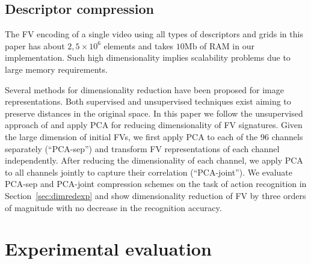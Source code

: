 \documentclass[10pt,twocolumn,letterpaper]{article}
\begin{document}
\subsection{Descriptor compression}
\label{sec:dimred}
The FV encoding of a single video using all types of descriptors and grids in this paper has about $2,5\times10^6$ elements and takes $10\text{Mb}$ of RAM in our implementation. Such high dimensionality implies scalability problems due to large memory requirements. %

Several methods for dimensionality reduction have been proposed for image representations. Both supervised and unsupervised techniques exist aiming to preserve distances in the original space.
In this paper we follow the unsupervised approach of \cite{Jegou12} and apply PCA for reducing dimensionality of FV signatures. Given the large dimension of initial FVs, we first apply PCA to each of the 96 channels separately (``PCA-sep'') and transform FV representations of each channel independently. After reducing the dimensionality of each channel, we apply PCA to all channels jointly to capture their correlation (``PCA-joint''). We evaluate PCA-sep and PCA-joint compression schemes on the task of action recognition in Section~\ref{sec:dimredexp} and show dimensionality reduction of FV by three orders of magnitude with no decrease in the recognition accuracy.



\section{Experimental evaluation}
\label{sec:experiments}
\end{document}
